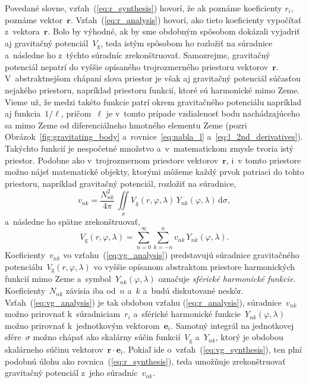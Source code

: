 \documentclass[a4paper, 12pt]{book}
\newcommand{\diff}{\mathrm d}
\newcommand{\gidx}{\mathrm g}
\let\vec\mathbf
\begin{document}
Povedané slovne, vzťah~(\ref{eq:r_synthesis}) hovorí, že ak poznáme koeficienty 
$r_i$, poznáme vektor~$\vec r$.  Vzťah~(\ref{eq:r_analysis}) hovorí, ako tieto 
koeficienty vypočítať z~vektora~$\vec r$.  Bolo by výhodné, ak by sme obdobným 
spôsobom dokázali vyjadriť aj gravitačný potenciál~$V_\gidx$, teda istým 
spôsobom ho rozložiť na súradnice a~následne ho z~týchto súradníc 
zrekonštruovať.  Samozrejme, gravitačný potenciál nepatrí do vyššie opísaného 
trojrozmerného priestoru vektorov~$\vec r$.  V~abstraktnejšom chápaní slova 
priestor je však aj gravitačný potenciál súčasťou nejakého priestoru, napríklad 
priestoru funkcií, ktoré sú harmonické mimo Zeme.  Vieme už, že medzi takéto 
funkcie patrí okrem gravitačného potenciálu napríklad aj funkcia~$1 \slash 
\ell$, pričom~$\ell$ je v~tomto prípade vzdialenosť bodu nachádzajúceho sa mimo 
Zeme od diferenciálneho hmotného elementu Zeme (pozri 
Obrázok~\ref{fig:gravitating_body} a~rovnice~\ref{eq:nabla_l} 
a~\ref{eq:l_2nd_derivatives}).  Takýchto funkcií je nespočetné množstvo 
a~v~matematickom zmysle tvoria istý priestor.  Podobne ako v~trojrozmernom 
priestore vektorov~$\vec r$, i~v tomto priestore možno nájsť matematické 
objekty, ktorými môžeme každý prvok patriaci do tohto priestoru, napríklad 
gravitačný potenciál, rozložiť na súradnice,
%
\begin{equation}
\label{eq:vg_analysis}
v_{nk} = \frac{N^2_{nk}}{4\pi} \, \iint\limits_{\sigma} V_\gidx(r, \varphi, 
\lambda) \, Y_{nk}(\varphi, \lambda) \, \diff \sigma{,}
\end{equation}
%
a~následne ho spätne zrekonštruovať,
%
\begin{equation}
\label{eq:vg_synthesis}
V_\gidx(r, \varphi, \lambda) = \sum_{n = 0}^{\infty} \sum_{k = -n}^{n} v_{nk}
\, Y_{nk}(\varphi, \lambda){.}
\end{equation}
%
Koeficienty~$v_{nk}$ vo vzťahu~(\ref{eq:vg_analysis}) predstavujú súradnice
gravitačného potenciálu~$V_\gidx(r, \varphi, \lambda)$ vo vyššie opísanom
abstraktom priestore harmonických funkcií mimo Zeme a~symbol~$Y_{nk}(\varphi, 
\lambda)$
označuje \emph{sférické harmonické funkcie}.  Koeficienty~$N_{nk}$ závisia
iba od~$n$ a~$k$ a~budú diskutované neskôr.  Vzťah~(\ref{eq:vg_analysis}) je
tak obdobou vzťahu (\ref{eq:r_analysis}), súradnice~$v_{nk}$ možno prirovnať
k~súradniciam~$r_i$ a~sférické harmonické funkcie~$Y_{nk}(\varphi, \lambda)$
možno prirovnať k~jednotkovým vektorom~$\vec e_i$.  Samotný integrál na
jednotkovej sfére~$\sigma$ možno chápať ako skalárny súčin funkcií~$V_\gidx$
a~$Y_{nk}$, ktorý je obdobou skalárneho súčinu vektorov~$\vec r \cdot \vec
e_i$.  Pokiaľ ide o~vzťah~(\ref{eq:vg_synthesis}), ten plní podobnú úlohu ako
rovnica~(\ref{eq:r_synthesis}), teda umožňuje zrekonštruovať gravitačný
potenciál z~jeho súradníc~$v_{nk}$.
\end{document}
